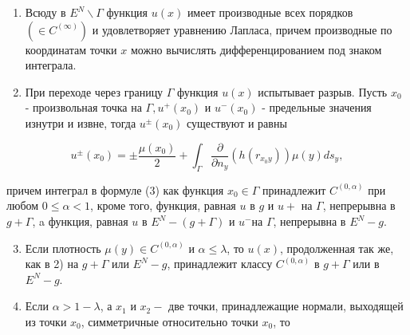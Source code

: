 \documentclass[10pt]{article}
\begin{document}
\begin{enumerate}

  \item Всюду в $E^{N} \backslash \Gamma$ функция $u(x)$ имеет производные всех порядков $\left(\in C^{(\infty)}\right)$ и удовлетворяет уравнению Лапласа, причем производные по координатам точки $x$ можно вычислять дифференцированием под знаком интеграла.



  \item При переходе через границу $\Gamma$ функция $u(x)$ испытывает разрыв. Пусть $x_{0}$ - произвольная точка на $\Gamma, u^{+}\left(x_{0}\right)$ и $u^{-}\left(x_{0}\right)$ - предельные значения изнутри и извне, тогда $u^{ \pm}\left(x_{0}\right)$ существуют и равны



\end{enumerate}



\[

u^{ \pm}\left(x_{0}\right)= \pm \frac{\mu\left(x_{0}\right)}{2}+\int_{\Gamma} \frac{\partial}{\partial n_{y}}\left(h\left(r_{x_{0} y}\right)\right) \mu(y) d s_{y},

\]



причем интеграл в формуле (3) как функция $x_{0} \in \Gamma$ принадлежит $C^{(0, \alpha)}$ при любом $0 \leqslant \alpha<1$, кроме того, функция, равная $u$ в $g$ и $u+$ на $\Gamma$, непрерывна в $g+\Gamma$, a функция, равная $u$ в $E^{N}-(g+\Gamma)$ и $u^{-}$на $\Gamma$, непрерывна в $E^{N}-g$.



\begin{enumerate}

  \setcounter{enumi}{2}

  \item Если плотность $\mu(y) \in C^{(0, \alpha)}$ и $\alpha \leqslant \lambda$, то $u(x)$, продолженная так же, как в 2) на $g+\Gamma$ или $E^{N}-g$, принадлежит классу $C^{(0, \alpha)}$ в $g+\Gamma$ или в $E^{N}-g$.



  \item Если $\alpha>1-\lambda$, а $x_{1}$ и $x_{2}-$ две точки, принадлежащие нормали, выходящей из точки $x_{0}$, симметричные относительно точки $x_{0}$, то



\end{enumerate}
\end{document}
